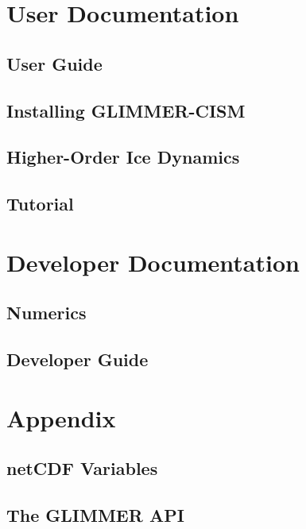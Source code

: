 \mainmatter
\part{User Documentation}

\chapter{User Guide}
\newcommand{\dir}{ug}


\chapter{Installing GLIMMER-CISM}
\renewcommand{\dir}{install}


\chapter{Higher-Order Ice Dynamics}
\renewcommand{\dir}{higher-order}


\chapter{Tutorial}
\renewcommand{\dir}{tut}


\part{Developer Documentation}

\chapter{Numerics}
\renewcommand{\dir}{num}


\chapter{Developer Guide}
\renewcommand{\dir}{dg}


\renewcommand{\dir}{ext}


\part{Appendix}
\appendix
\renewcommand{\dir}{ug}
\chapter{netCDF Variables}

\chapter{The GLIMMER API}



\renewcommand{\dir}{ext}




